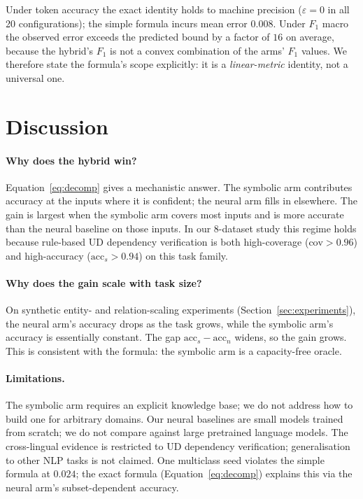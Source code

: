 \documentclass[11pt,a4paper]{article}
\begin{document}
Under token accuracy the exact identity holds to machine precision
($\varepsilon = 0$ in all 20 configurations); the simple formula
incurs mean error $0.008$. Under $F_1$ macro the observed error
exceeds the predicted bound by a factor of $16$ on average, because
the hybrid's $F_1$ is not a convex combination of the arms' $F_1$
values. We therefore state the formula's scope explicitly: it is a
\emph{linear-metric} identity, not a universal one.

\section{Discussion}
\label{sec:discussion}
\paragraph{Why does the hybrid win?}
Equation~\ref{eq:decomp} gives a mechanistic answer. The symbolic arm
contributes accuracy at the inputs where it is confident; the neural
arm fills in elsewhere. The gain is largest when the symbolic arm
covers most inputs and is more accurate than the neural baseline on
those inputs. In our 8-dataset study this regime holds because
rule-based UD dependency verification is both high-coverage
($\text{cov} > 0.96$) and high-accuracy
($\text{acc}_s > 0.94$) on this task family.

\paragraph{Why does the gain scale with task size?}
On synthetic entity- and relation-scaling experiments
(Section~\ref{sec:experiments}), the neural arm's accuracy drops as
the task grows, while the symbolic arm's accuracy is essentially
constant. The gap $\text{acc}_s - \text{acc}_n$ widens, so the gain
grows. This is consistent with the formula: the symbolic arm is a
capacity-free oracle.

\paragraph{Limitations.}
The symbolic arm requires an explicit knowledge base; we do not
address how to build one for arbitrary domains. Our neural baselines
are small models trained from scratch; we do not compare against
large pretrained language models. The cross-lingual evidence is
restricted to UD dependency verification; generalisation to other
NLP tasks is not claimed. One multiclass seed violates the simple
formula at $0.024$; the exact formula
(Equation~\ref{eq:decomp}) explains this via the neural arm's
subset-dependent accuracy.
\end{document}
